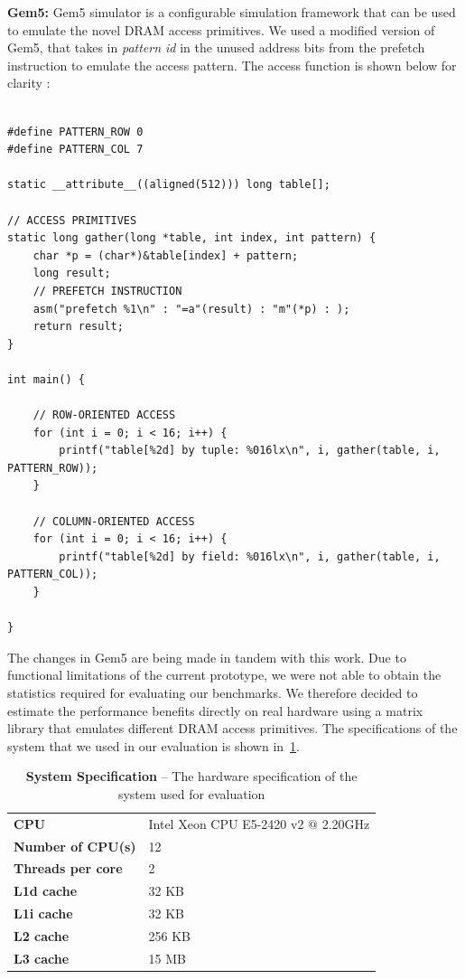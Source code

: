 \documentclass[letterpaper]{article}
\begin{document}
\textbf{Gem5:} Gem5 simulator is a configurable simulation framework that can
be used to emulate the novel DRAM access primitives. We used a modified version
of Gem5, that takes in \textit{pattern id} in the unused address bits from the
prefetch instruction to emulate the access pattern. The access function is 
shown below for clarity :

\begin{lstlisting}[caption={Gem5 DRAM Access Primitive
Simulation}]

#define PATTERN_ROW 0
#define PATTERN_COL 7

static __attribute__((aligned(512))) long table[];

// ACCESS PRIMITIVES
static long gather(long *table, int index, int pattern) {
    char *p = (char*)&table[index] + pattern;
    long result;
    // PREFETCH INSTRUCTION
    asm("prefetch %1\n" : "=a"(result) : "m"(*p) : );
    return result;
}

int main() {

	// ROW-ORIENTED ACCESS
	for (int i = 0; i < 16; i++) {
		printf("table[%2d] by tuple: %016lx\n", i, gather(table, i, PATTERN_ROW));
	}

	// COLUMN-ORIENTED ACCESS
	for (int i = 0; i < 16; i++) {
		printf("table[%2d] by field: %016lx\n", i, gather(table, i, PATTERN_COL));
	}

}
\end{lstlisting}
 
The changes in Gem5 are being made in tandem with this work. Due to functional
limitations of the current prototype, we were not able to obtain the statistics 
required for evaluating our benchmarks. 
We therefore decided to estimate the performance benefits directly on real
hardware using a matrix library that emulates different DRAM access primitives.
The specifications of the system that we used in our evaluation is shown
in~\cref{tab:spec}.

\begin{table}
    \centering
    \begin{tabular}{l|l}
    \textbf{CPU} & Intel Xeon CPU E5-2420 v2 $@$ 2.20GHz\\
    \textbf{Number of CPU(s)} & 12 \\
    \textbf{Threads per core} & 2 \\
    \textbf{L1d cache} & 32 KB \\
	\textbf{L1i cache} & 32 KB \\
	\textbf{L2 cache} & 256 KB \\
	\textbf{L3 cache} & 15 MB \\
  	\end{tabular}
    \caption{
        \textbf{System Specification} -- The hardware specification of the
        system used for evaluation }
    \label{tab:spec}
\end{table}
\end{document}
